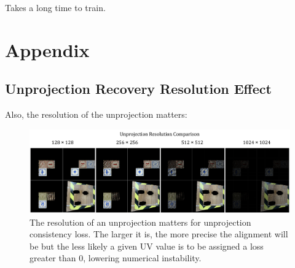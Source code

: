 \documentclass{article}
\begin{document}
Takes a long time to train.






\clearpage
\acknowledgments{}








\clearpage

\section{Appendix} 
\label{sec:appendix}

	\subsection*{Unprojection Recovery Resolution Effect}

		Also, the resolution of the unprojection matters:



		\begin{figure}[H]
			\begin{center}
				\includegraphics[width=400pt]{../images/unprojection_resolution_comparison.pdf}
			\end{center}
			\caption{
				The resolution of an unprojection matters for unprojection consistency loss. The larger it is, the more precise the alignment will be but the less likely a given UV value is to be assigned a loss greater than 0, lowering numerical instability.
			}
			\label{fig:unprojection_resolution_comparison}
		\end{figure}
\end{document}
